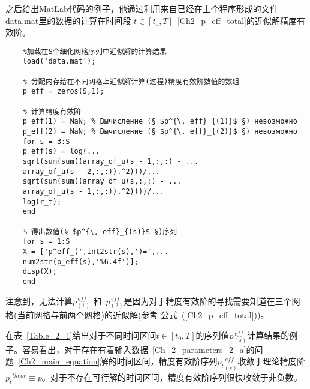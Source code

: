 \documentclass[twoside]{book}
\begin{document}
\begin{CJK*}{GBK}{song}
	
	之后给出MatLab代码的例子，他通过利用来自已经在上个程序形成的文件data.mat里的数据的计算在时间段 $t \in [t_0,T]$~\eqref{Ch2_p_eff_total}的近似解精度有效阶。
	\begin{lstlisting}
	%加载在S个细化网格序列中近似解的计算结果
	load('data.mat');
	
	% 分配内存给在不同网格上近似解计算(过程)精度有效阶数值的数组
	p_eff = zeros(S,1);
	
	% 计算精度有效阶
	p_eff(1) = NaN; % Вычисление (§ $p^{\, eff}_{(1)}$ §) невозможно
	p_eff(2) = NaN; % Вычисление (§ $p^{\, eff}_{(2)}$ §) невозможно
	for s = 3:S
	p_eff(s) = log(...
	sqrt(sum(sum((array_of_u(s - 1,:,:) - ...
	array_of_u(s - 2,:,:)).^2)))/...
	sqrt(sum(sum((array_of_u(s,:,:) - ...
	array_of_u(s - 1,:,:)).^2))))/...
	log(r_t);
	end
	
	% 得出数值(§ $p^{\, eff}_{(s)}$ §)序列
	for s = 1:S
	X = ['p^eff_(',int2str(s),')=',...
	num2str(p_eff(s),'%6.4f')];
	disp(X);
	end
	\end{lstlisting}
	
	注意到，无法计算$p^{\, eff}_{(1)}$ 和~$p^{\, eff}_{(2)}$是因为对于精度有效阶的寻找需要知道在三个网格(当前网格与前两个网格)的近似解(参考 公式~(\ref{Ch2_p_eff_total}))。

	
	在表~\ref{Table_2_1}给出对于不同时间区间$t \in [t_0,T]$的序列值$p^{\, eff}_{(s)}$计算结果的例子。容易看出，对于存在有着输入数据~\eqref{Ch_2_parameters_2_a}的问题~\eqref{Ch2_main_equation}解的时间区间，精度有效阶序列${p_t}^{\, eff}_{(s)}$收敛于理论精度阶${p_t}^{theor} \equiv p$。对于不存在可行解的时间区间，精度有效阶序列很快收敛于非负数。


\end{CJK*}
\end{document}
